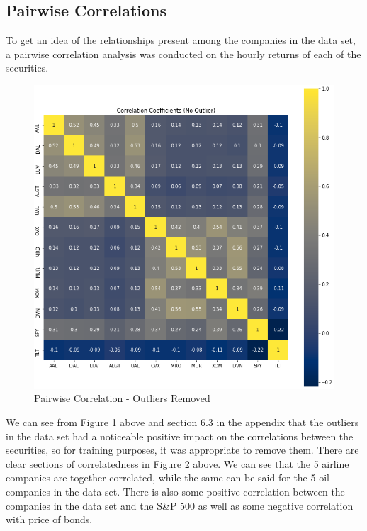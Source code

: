 \documentclass{article}
\begin{document}
\subsection{Pairwise Correlations}
To get an idea of the relationships present among the companies in the data set, a pairwise
correlation analysis was conducted on the hourly returns of each of the securities.
\begin{figure}[h!]
  \centering
    \includegraphics[width=.6\linewidth]{../Figures/pair_corr_no_out.png}
    \caption{Pairwise Correlation - Outliers Removed}
\end{figure}
We can see from Figure 1 above and section 6.3 in the appendix that the outliers in the 
data set had a noticeable positive impact on the correlations between the securities,
so for training purposes, it was appropriate to remove them. There are clear sections
of correlatedness in Figure 2 above. We can see that the 5 airline companies are together
correlated, while the same can be said for the 5 oil companies in the data set. There is also
some positive correlation between the companies in the data set and the S\&P 500 as well as some
negative correlation with price of bonds.
\end{document}
